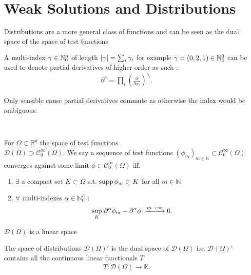 \section{Weak Solutions and Distributions}
Distributions are a more general class of functions and can be seen as the dual space of the space of test functions 
\begin{definition}
A multi-index $\gamma \in \mathbb{N}_0^n$ of length $\lvert\gamma \rvert = \sum_{i} \gamma_i$
for example $\gamma  = (0,2,1) \in \mathbb{N}^3_0$  can be used to denote partial derivatives of higher order as such : 
\begin{align*}
  \partial^{\gamma } = \prod_i (\frac{\partial}{\partial x_i})^{\gamma_i}
.\end{align*}
\end{definition}
\begin{myblock}
Only sensible cause partial derivatives commute as otherwise the index would be ambiguous.
\end{myblock}  
\hspace{0mm}\\
\begin{definition}
 For $\Omega \subset  \mathbb{R}^{d} $  the space of test functions \\ $\mathcal{D}(\Omega) \supset \mathcal{C}_0^{\infty}(\Omega) $.
 We say a sequence of test functions $(\phi_m)_{m \in  \mathbb{N}} \subset \mathcal{C}_0^{\infty}(\Omega )$ converges against some limit $\phi \in  \mathcal{C}_0^{\infty}(\Omega ) $ iff.
 \begin{enumerate}
  \item $\exists $ a compact set $K \subset  \Omega $ s.t. $\operatorname*{supp} \phi_m \subset  K$ for all $m \in  \mathbb{N}$ 
  \item $\forall $ multi-indexes $\alpha \in  \mathbb{N}_0^{n}  $ :
    \begin{align*}
      \sup_{K} \lvert\partial^{\alpha} \phi_m - \partial ^{\alpha } \phi   \rvert \xrightarrow{m\to \infty} 0
    .\end{align*}
 \end{enumerate}
\end{definition}
\begin{remark}
  $\mathcal{D}(\Omega )$ is a linear space  
\end{remark}
\begin{definition}[Distribution]
  The space of distributions  $\mathcal{D}(\Omega)'$  is the dual space of $\mathcal{D}(\Omega )$ i.e. 
  $\mathcal{D}(\Omega )'$ contains all the continuous linear functionals $T$ 
  \begin{align*}
    T : \mathcal{D}(\Omega ) \to  \mathbb{K}
  .\end{align*}
\end{definition}
